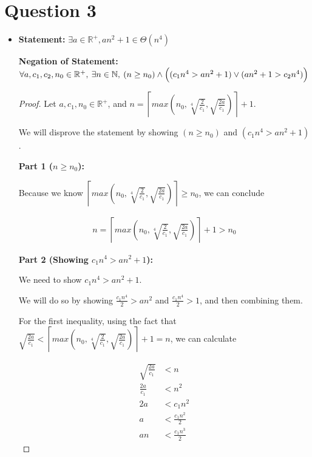 \documentclass[12pt]{article}
\begin{document}
\section*{Question 3}
\begin{itemize}
    \item

    \textbf{Statement:} $\exists a \in \mathbb{R}^{+}, an^2 + 1 \in \Theta(n^4)$

    \textbf{Negation of Statement:} $\forall a,c_1,c_2,n_0 \in \mathbb{R}^{+},\:
    \exists n \in \mathbb{N},\:(n \geq n_0)\land \Bigl( (c_1n^4 > an^2 + 1) \lor
    (an^2 + 1 > c_2n^4) \Bigr)$

    \begin{proof}
    Let $a,c_1,n_0 \in \mathbb{R}^{+}$, and $n = \left\lceil max(n_0,
    \sqrt[4]{\frac{2}{c_1}},\sqrt{\frac{2a}{c_1}}) \right\rceil + 1$.

    \bigskip

    We will disprove the statement by showing $(n \geq n_0)$ and $(c_1n^4 > an^2 + 1)$.

    \bigskip

    \textbf{Part 1 ($n \geq n_0$):}

    \bigskip

    Because we know $\left\lceil max(n_0,\sqrt[4]{\frac{2}{c_1}},\sqrt{\frac{2a}{c_1}}) \right\rceil \geq n_0$,
    we can conclude

    \setcounter{equation}{0}
    \begin{align}
        n = \left\lceil max(n_0, \sqrt[4]{\frac{2}{c_1}},\sqrt{\frac{2a}{c_1}}) \right\rceil + 1 > n_0
    \end{align}

    \bigskip

    \textbf{Part 2 (Showing $c_1n^4 > an^2 + 1$):}

    \bigskip

    We need to show $c_1n^4 > an^2 + 1$.

    \bigskip

    We will do so by showing $\frac{c_1n^4}{2} > an^2$ and $\frac{c_1n^4}{2} > 1$,
    and then combining them.

    \bigskip

    For the first inequality, using the fact that $\sqrt{\frac{2a}{c_1}} <
    \left\lceil max(n_0, \sqrt[4]{\frac{2}{c_1}},\sqrt{\frac{2a}{c_1}}) \right\rceil + 1 = n$,
    we can calculate

    \begin{align}
        \sqrt{\frac{2a}{c_1}} &< n\\
        \frac{2a}{c_1} &< n^2\\
        2a &< c_1n^2\\
        a &< \frac{c_1n^2}{2}\\
        an &< \frac{c_1n^3}{2}
    \end{align}


\end{proof}
\end{itemize}
\end{document}
